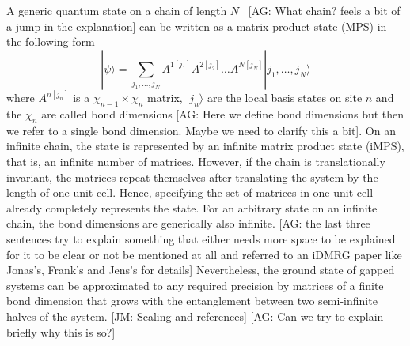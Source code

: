 \documentclass[aps,prx,10pt,twocolumn,floatfix,superscriptaddress,showpacs,numerical,footinbib]{revtex4-1}
\newcommand{\ket}[1]{| #1 \rangle}
\newcommand{\noteAG}[1]{{\color{blue} [AG: #1]}}
\newcommand{\noteJM}[1]{{\color{red} [JM: #1]}}
\begin{document}
A generic quantum state on a chain of length $N$~\noteAG{What chain? feels a bit of a jump in the explanation} can be written as a matrix product state (MPS) in the following form
%
\begin{equation}
%
 \ket{\psi} = \sum_{j_1, \ldots, j_N} A^{1 \left[j_1\right]} A^{2 \left[j_2\right]} \ldots A^{N \left[j_N\right]} \ket{j_1, \ldots, j_N}
\end{equation}
%
where $A^{n \left[j_n\right]}$ is a $\chi_{n-1} \times \chi_n$ matrix, $\ket{j_n}$ are the local basis states on site $n$ and the $\chi_n$ are called bond dimensions
\noteAG{Here we define bond dimensions but then we refer to a single bond dimension. Maybe we need to clarify this a bit}. 
%
On an infinite chain, the state is represented by an infinite matrix product state (iMPS), that is, an infinite number of matrices. 
%
However, if the chain is translationally invariant, the matrices repeat themselves after translating the system by the length of one unit cell. 
%
Hence, specifying the set of matrices in one unit cell already completely represents the state. 
%
For an arbitrary state on an infinite chain, the bond dimensions are generically also infinite. 
\noteAG{the last three sentences try to explain something that either needs more space to be explained for it to be clear
or not be mentioned at all and referred to an iDMRG paper like Jonas's, Frank's and Jens's for details}
%
Nevertheless, the ground state of gapped systems can be approximated to any required precision by matrices of a finite bond dimension that grows with the entanglement between two semi-infinite halves of the system. \noteJM{Scaling and references}\noteAG{Can we try to explain briefly why this is so?}
\end{document}
